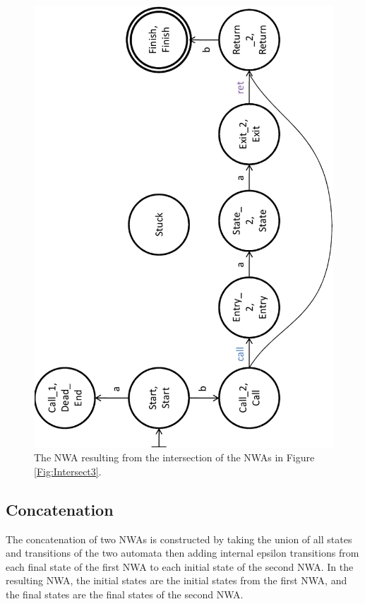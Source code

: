 \begin{figure}[p]
  \centering
    \includegraphics[width=12cm]{Figures/Figure8}
  \caption{The NWA resulting from the intersection of the NWAs in Figure \ref{Fig:Intersect3}.}
  \label{Fig:Intersect4}
\end{figure}



\subsection{Concatenation}
\label{Se:Concatenation}

The concatenation of two NWAs is constructed by taking the union of all
states and transitions of the two automata then adding
internal epsilon transitions from each final state of the first NWA to each
initial state of the second NWA.  In the resulting NWA, the initial states
are the initial states from the first NWA, and the final states are the final
states of the second NWA. %

